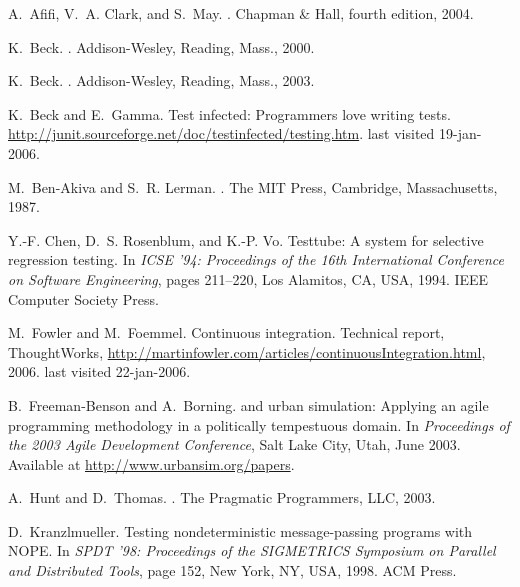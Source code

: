 \documentclass{sig-alternate}
\begin{document}
\begin{thebibliography}{10}

A.~Afifi, V.~A. Clark, and S.~May.
.
\newblock Chapman \& Hall, fourth edition, 2004.

K.~Beck.
.
\newblock Addison-Wesley, Reading, Mass., 2000.

K.~Beck.
.
\newblock Addison-Wesley, Reading, Mass., 2003.

K.~Beck and E.~Gamma.
\newblock Test infected: Programmers love writing tests.
\newblock \url{http://junit.sourceforge.net/doc/testinfected/testing.htm}.
\newblock last visited 19-jan-2006.

M.~Ben-Akiva and S.~R. Lerman.
.
\newblock The MIT Press, Cambridge, Massachusetts, 1987.

Y.-F. Chen, D.~S. Rosenblum, and K.-P. Vo.
\newblock Testtube: A system for selective regression testing.
\newblock In {\em ICSE '94: Proceedings of the 16th International Conference on
  Software Engineering}, pages 211--220, Los Alamitos, CA, USA, 1994. IEEE
  Computer Society Press.

M.~Fowler and M.~Foemmel.
\newblock Continuous integration.
\newblock Technical report, ThoughtWorks,
  \url{http://martinfowler.com/articles/continuousIntegration.html}, 2006.
\newblock last visited 22-jan-2006.

B.~Freeman-Benson and A.~Borning.
 and urban simulation: Applying an agile programming methodology
  in a politically tempestuous domain.
\newblock In {\em Proceedings of the 2003 Agile Development Conference}, Salt
  Lake City, Utah, June 2003.
\newblock Available at \url{http://www.urbansim.org/papers}.

A.~Hunt and D.~Thomas.
.
\newblock The Pragmatic Programmers, LLC, 2003.

D.~Kranzlmueller.
\newblock Testing nondeterministic message-passing programs with {NOPE}.
\newblock In {\em SPDT '98: Proceedings of the SIGMETRICS Symposium on Parallel
  and Distributed Tools}, page 152, New York, NY, USA, 1998. ACM Press.


\end{thebibliography}
\end{document}
